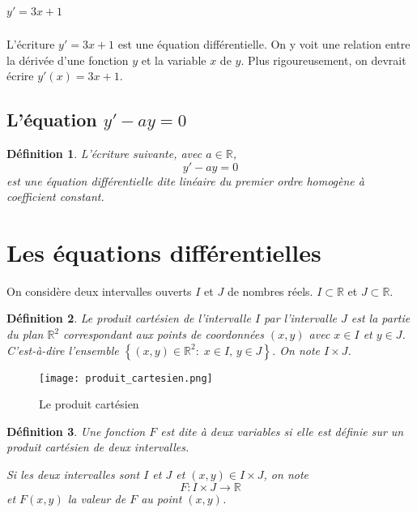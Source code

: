 \documentclass[10pt,a4paper]{article}
\newtheorem{dfn}{Définition}
\begin{document}
\subparagraph{$y'= 3x+1$}
L'écriture $y'= 3x+1$ est une équation différentielle. On y voit une relation entre la dérivée d'une fonction $y$ et la variable $x$ de $y$. Plus rigoureusement, on devrait écrire $y'(x)=3x+1$.


\subsection{L'équation $y'-ay=0$}




\begin{dfn}
L'écriture suivante, avec $a\in\mathbb{R}$,
$$y'-ay=0$$
est une équation différentielle dite linéaire du premier ordre homogène à coefficient constant.
\end{dfn}

\section{Les équations différentielles}


On considère deux intervalles ouverts $I$ et $J$ de nombres réels.
$I\subset \mathbb{R}$ et $J\subset \mathbb{R}$.

\begin{dfn}
Le \textit{produit cartésien} de l'intervalle $I$ par l'intervalle $J$ est la partie du plan
$\mathbb{R}^2$
correspondant aux points de coordonnées $(x,y)$ avec $x\in I$ et $y\in J$.
C'est-à-dire l'ensemble $\left\lbrace (x,y) \in \mathbb{R}^2:\; x\in I,\, y\in J \right\rbrace$.
On note $I\times J$.
\end{dfn}
\begin{figure}[hbtp]
\centering
\texttt{[image: produit\_cartesien.png]}
\caption{Le produit cartésien}
\end{figure}

\begin{dfn}
Une fonction $F$ est dite à deux variables si elle est définie sur un produit cartésien de deux intervalles.

Si les deux intervalles sont $I$ et $J$ et $(x,y)\in I \times J$, on note 
$$F:I\times J \rightarrow \mathbb{R}$$
et $F(x,y)$ la valeur de $F$ au point $(x,y)$.
\end{dfn}
\end{document}

